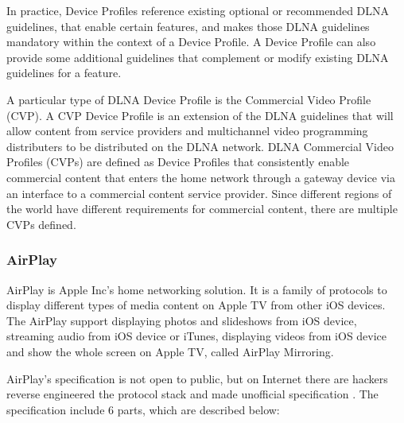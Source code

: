 \begin{enumerate}
In practice, Device Profiles reference existing optional or recommended DLNA guidelines, that enable 
certain features, and makes those DLNA guidelines mandatory within the context of a Device Profile. 
A Device Profile can also provide some additional guidelines that complement or modify existing DLNA 
guidelines for a feature.

A particular type of DLNA Device Profile is the Commercial Video Profile (CVP). A CVP Device Profile 
is an extension of the DLNA guidelines that will allow content from service providers and multichannel 
video programming distributers to be distributed on the DLNA network. DLNA Commercial Video Profiles 
(CVPs) are defined as Device Profiles that consistently enable commercial content that enters the home 
network through a gateway device via an interface to a commercial content service provider. Since 
different regions of the world have different requirements for commercial content, there are multiple 
CVPs defined.

\end{enumerate}

\subsubsection{AirPlay}
AirPlay is Apple Inc's home networking solution. It is a family of protocols
to display different types of media content on Apple TV from other iOS devices.
The AirPlay support displaying photos and slideshows from iOS device, streaming
audio from iOS device or iTunes, displaying videos from iOS device and
show the whole screen on Apple TV, called AirPlay Mirroring.

AirPlay's specification is not open to public, but on Internet there are
hackers reverse engineered the protocol stack and made unofficial specification
\cite{AirPlay-spec}. The specification include 6 parts, which are described
below:

